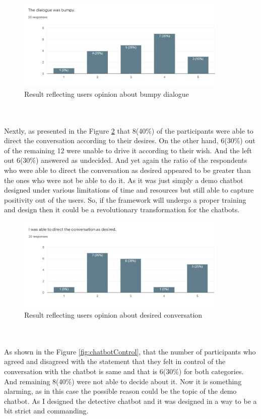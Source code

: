 \begin{figure}[!h]
    \centering
    \includegraphics[width=0.9\textwidth]{img/Bumpy_Dialog.PNG}
    \caption{Result reflecting users opinion about bumpy dialogue}
    \label{fig:bumpDialo}
\end{figure}
\\~\\
Nextly, as presented in the Figure \ref{fig:desiredConv} that 8(40\%) of the participants were able to direct the conversation according to their desires. On the other hand, 6(30\%) out of the remaining 12 were unable to drive it according to their wish. And the left out 6(30\%) answered as undecided. And yet again the ratio of the respondents who were able to direct the conversation as desired appeared to be greater than the ones who were not be able to do it. As it was just simply a demo chatbot designed under various limitations of time and resources but still able to capture positivity out of the users. So, if the framework will undergo a proper training and design then it could be a revolutionary transformation for the chatbots.

\begin{figure}[!h]
    \centering
    \includegraphics[width=0.9\textwidth]{img/Desired_Conv.PNG}
    \caption{Result reflecting users opinion about desired conversation}
    \label{fig:desiredConv}
\end{figure}
\\~\\
As shown in the Figure \ref{fig:chatbotControl}, that the number of participants who agreed and disagreed with the statement that they felt in control of the conversation with the chatbot is same and that is 6(30\%) for both categories. And remaining 8(40\%) were not able to decide about it. Now it is something alarming, as in this case the possible reason could be the topic of the demo chatbot. As I designed the detective chatbot and it was designed in a way to be a bit strict and commanding. 

